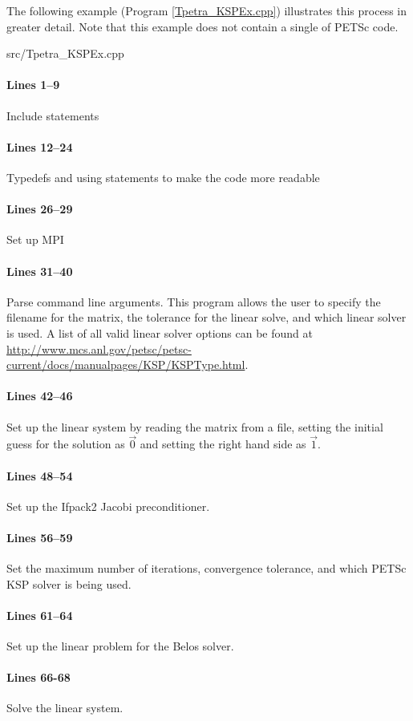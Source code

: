The following example (Program \ref{Tpetra_KSPEx.cpp}) illustrates this process
in greater detail.  Note that this example does not contain a single of PETSc
code.

\begin{lstinputlisting}[caption=Tpetra\_KSPEx.cpp,label=Tpetra_KSPEx.cpp]{src/Tpetra_KSPEx.cpp}
\end{lstinputlisting}

\paragraph{Lines 1--9}
Include statements

\paragraph{Lines 12--24}
Typedefs and using statements to make the code more readable

\paragraph{Lines 26--29}
Set up MPI

\paragraph{Lines 31--40} 
Parse command line arguments.  This program allows the user to specify the
filename for the matrix, the tolerance for the linear solve, and which linear
solver is used.  A list of all valid linear solver options can be found at
\url{http://www.mcs.anl.gov/petsc/petsc-current/docs/manualpages/KSP/KSPType.html}.

\paragraph{Lines 42--46}
Set up the linear system by reading the matrix from a file, setting the initial
guess for the solution as $\vec{0}$ and setting the right hand side as
$\vec{1}$.

\paragraph{Lines 48--54}
Set up the Ifpack2 Jacobi preconditioner.

\paragraph{Lines 56--59}
Set the maximum number of iterations, convergence tolerance, and which PETSc
KSP solver is being used.

\paragraph{Lines 61--64}
Set up the linear problem for the Belos solver.

\paragraph{Lines 66-68}
Solve the linear system.
